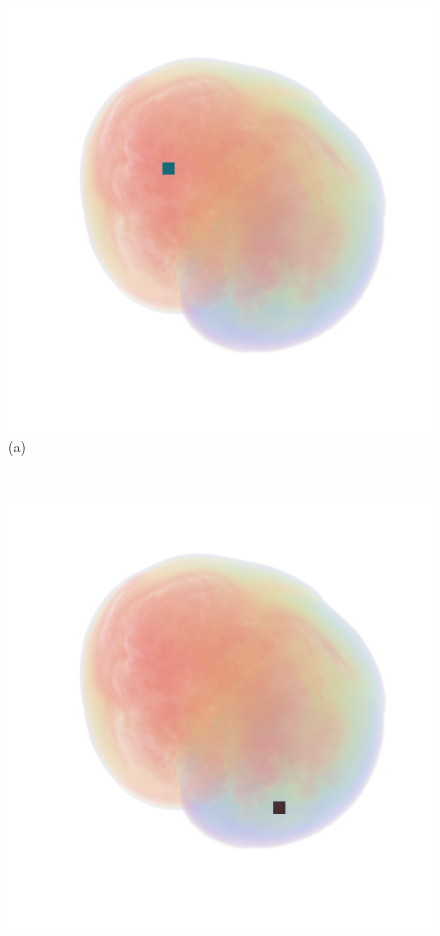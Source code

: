 \documentclass[twoside,twocolumn,10pt]{article}
\begin{document}
\begin{figure}
	\centering
	\begin{minipage}{.2\textwidth}
		\centering
		\includegraphics[width=1\linewidth]{crop/supernova_selection_red}
		(a)
	\end{minipage}~
	\begin{minipage}{.2\textwidth}
		\centering
		\includegraphics[width=1\linewidth]{crop/supernova_selection_green}

\end{minipage}
\end{figure}
\end{document}
